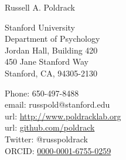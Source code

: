 \reversemarginpar 
{\LARGE Russell A. Poldrack}\\[4mm] 
\vspace{-1cm} 

\begin{multicols}{2} 
Stanford University\\
Department of Psychology\\
Jordan Hall, Building 420\\
450 Jane Stanford Way\\
Stanford, CA, 94305-2130\\
\columnbreak 

Phone: 650-497-8488 \\
email: russpold@stanford.edu \\
url: \href{www.poldracklab.org}{http://www.poldracklab.org} \\
url: \href{http://github.com/poldrack}{github.com/poldrack} \\
Twitter: @russpoldrack \\
ORCID: \href{https://orcid.org/0000-0001-6755-0259}{0000-0001-6755-0259} \\
\end{multicols}


